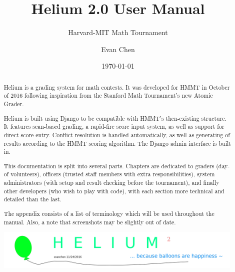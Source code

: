 \documentclass[11pt]{scrreprt}
\begin{document}
\title{Helium 2.0 User Manual}
\subtitle{Harvard-MIT Math Tournament}
\author{Evan Chen}
\date{\today}
\maketitle

\begin{abstract}
	Helium is a grading system for math contests.
	It was developed for HMMT in October of 2016 following inspiration
	from the Stanford Math Tournament's new Atomic Grader.

	Helium is built using Django to be compatible with
	HMMT's then-existing structure.
	It features scan-based grading, a rapid-fire score input system,
	as well as support for direct score entry.
	Conflict resolution is handled automatically,
	as well as generating of results according to the
	HMMT scoring algorithm.
	The Django admin interface is built in.

	This documentation is split into several parts.
	Chapters are dedicated to graders (day-of volunteers),
	officers (trusted staff members with extra responsibilities),
	system administrators (with setup and result checking before the tournament),
	and finally other developers (who wish to play with code),
	with each section more technical and detailed than the last.

	The appendix consists of a list of terminology which
	will be used throughout the manual.
	Also, a note that screenshots may be slightly out of date.

	\begin{center}
		\includegraphics[width=0.99\textwidth]{../img/balloons.png}
	\end{center}
\end{abstract}

\tableofcontents






\appendix


\end{document}
